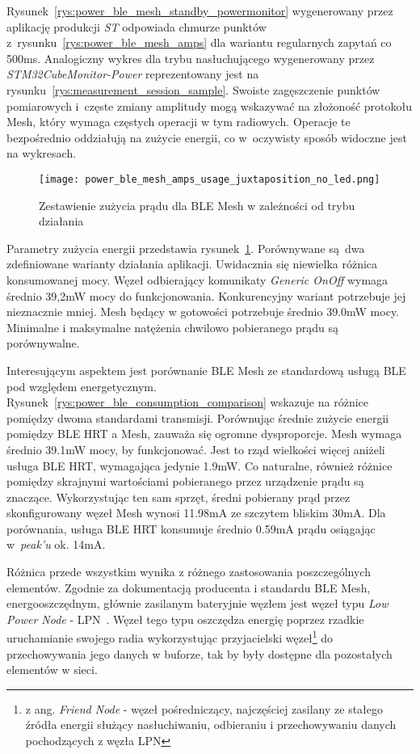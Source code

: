Rysunek~\ref{rys:power_ble_mesh_standby_powermonitor} wygenerowany przez aplikację produkcji \textit{ST} odpowiada chmurze punktów
z~rysunku~\ref{rys:power_ble_mesh_amps} dla wariantu regularnych zapytań co 500ms. Analogiczny wykres dla
trybu nasłuchującego wygenerowany przez \textit{STM32CubeMonitor-Power} reprezentowany jest na rysunku~\ref{rys:measurement_session_sample}.
Swoiste zagęszczenie punktów pomiarowych i~częste zmiany amplitudy mogą wskazywać na złożoność protokołu Mesh,
który wymaga częstych operacji w tym radiowych. Operacje te bezpośrednio oddziałują na zużycie energii, co w~oczywisty
sposób widoczne jest na wykresach.


\begin{figure}[!ht]
	\centering \texttt{[image: power\_ble\_mesh\_amps\_usage\_juxtaposition\_no\_led.png]} 
	\caption{Zestawienie zużycia prądu dla BLE Mesh w zależności od trybu działania}
	\label{rys:power_ble_mesh_amps_usage_juxtaposition}
\end{figure}

Parametry zużycia energii przedstawia rysunek~\ref{rys:power_ble_mesh_amps_usage_juxtaposition}. Porównywane są dwa zdefiniowane
warianty działania aplikacji. Uwidacznia się niewielka różnica konsumowanej mocy. Węzeł odbierający komunikaty \textit{Generic OnOff}
wymaga średnio 39,2mW mocy do funkcjonowania. Konkurencyjny wariant potrzebuje jej nieznacznie mniej. Mesh będący w gotowości
potrzebuje średnio 39.0mW mocy. Minimalne i maksymalne natężenia chwilowo pobieranego prądu są porównywalne.

Interesującym aspektem jest porównanie BLE Mesh ze standardową usługą BLE pod względem energetycznym. Rysunek~\ref{rys:power_ble_consumption_comparison}
wskazuje na różnice pomiędzy dwoma standardami transmisji. Porównując średnie zużycie energii pomiędzy BLE HRT a Mesh, zauważa 
się ogromne dysproporcje. Mesh wymaga średnio 39.1mW mocy, by funkcjonować. Jest to rząd wielkości więcej aniżeli
usługa BLE HRT, wymagająca jedynie 1.9mW. Co naturalne, również różnice pomiędzy skrajnymi wartościami pobieranego
przez urządzenie prądu są znaczące. Wykorzystując ten sam sprzęt, średni pobierany prąd przez skonfigurowany węzeł Mesh
wynosi 11.98mA ze szczytem bliskim 30mA. Dla porównania, usługa BLE HRT konsumuje średnio 0.59mA prądu osiągając
w~\textit{peak'u} ok. 14mA.

Różnica przede wszystkim wynika z różnego zastosowania poszczególnych elementów. Zgodnie za dokumentacją producenta i standardu BLE Mesh,
energooszczędnym, głównie zasilanym bateryjnie węzłem jest węzeł typu \textit{Low Power Node} - LPN~\cite{st_an5292_2021}\cite{wooley_martin_bluetooth_2019}. Węzeł tego typu oszczędza energię poprzez rzadkie uruchamianie swojego radia
wykorzystując przyjacielski węzeł\footnote{z ang. \textit{Friend Node} - węzeł pośredniczący, najczęściej zasilany ze stałego 
źródła energii służący nasłuchiwaniu, odbieraniu i przechowywaniu danych pochodzących z węzła LPN} 
do przechowywania jego danych w buforze, tak by były dostępne dla pozostałych elementów w sieci.

